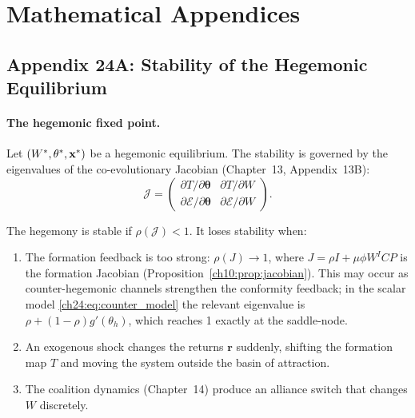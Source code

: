 \documentclass[../structural_economics_book.tex]{subfiles}
\begin{document}
\newpage
\section*{Mathematical Appendices}


\subsection*{Appendix 24A: Stability of the Hegemonic Equilibrium}
\label{ch24:app:stability}

\paragraph{The hegemonic fixed point.} Let $(W^*, \theta^*, \mathbf{x}^*)$ be a hegemonic equilibrium. The stability is governed by the eigenvalues of the co-evolutionary Jacobian (Chapter~13, Appendix~13B):
\begin{equation}
\mathcal{J} = \begin{pmatrix} \partial T/\partial\boldsymbol{\theta} & \partial T/\partial W \\ \partial\mathcal{E}/\partial\boldsymbol{\theta} & \partial\mathcal{E}/\partial W \end{pmatrix}.
\end{equation}

The hegemony is stable if $\rho(\mathcal{J}) < 1$. It loses stability when:
\begin{enumerate}
\item The formation feedback is too strong: $\rho(J) \to 1$, where $J = \rho I + \mu\phi W^I C P$ is the formation Jacobian (Proposition~\ref{ch10:prop:jacobian}). This may occur as counter-hegemonic channels strengthen the conformity feedback; in the scalar model \eqref{ch24:eq:counter_model} the relevant eigenvalue is $\rho + (1-\rho)g'(\theta_h)$, which reaches 1 exactly at the saddle-node.
\item An exogenous shock changes the returns $\mathbf{r}$ suddenly, shifting the formation map $T$ and moving the system outside the basin of attraction.
\item The coalition dynamics (Chapter~14) produce an alliance switch that changes $W$ discretely.
\end{enumerate}
\end{document}
